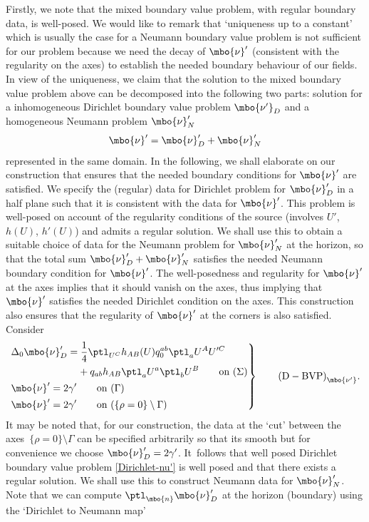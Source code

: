 Firstly, we note that the mixed boundary value problem, with regular boundary data, is well-posed. We would like to remark that `uniqueness up to a constant' which is usually the case for a Neumann boundary value problem is not sufficient for our problem because we need the decay of $\mbo{\nu}'$ (consistent with the regularity on the axes) to establish the needed boundary behaviour of our fields.
In view of the uniqueness, we claim that the solution to the mixed boundary value problem above can be decomposed into the following two parts: solution for a inhomogeneous Dirichlet boundary value problem $\mbo{\nu'}_D$ and a homogeneous Neumann problem $\mbo{\nu}'_N$
\begin{align*}
\mbo{\nu}' = \mbo{\nu}'_D + \mbo{\nu}'_N
\end{align*}
represented in the same domain. In the following, we shall elaborate on our construction that ensures that the needed boundary conditions for $\mbo{\nu}'$ are satisfied. We specify the (regular) data for Dirichlet problem for $\mbo{\nu}'_D$ in a half plane such that it is consistent with the data for $\mbo{\nu}'$. This problem is well-posed on account of the regularity conditions of the source (involves $U'$, $h(U)$, $h'(U)$) and admits a regular solution. We shall use this to obtain a suitable choice of data for the Neumann problem for $\mbo{\nu}'_N$ at the horizon, so that the total sum $\mbo{\nu}'_D + \mbo{\nu}'_N$ satisfies the needed Neumann boundary condition for $\mbo{\nu}'$. The well-posedness and regularity for $\mbo{\nu}'$ at the axes implies that it should vanish on the axes, thus implying that $\mbo{\nu}'$ satisfies the needed Dirichlet condition on the axes. This construction also ensures that the regularity of $\mbo{\nu}'$ at the corners is also satisfied. Consider
\begin{equation} \label{Dirichlet-nu'}
\left.\begin{aligned}
&\Delta_0 \mbo{\nu}_D'=\frac{1}{4} \ptl_{U^C} h_{AB}(U) q^{ab}_{0} \ptl_a U^A U'^C\\
& \hphantom{\Delta_0 \mbo{\nu}_D'=}{} + q_{ab} h_{AB} \ptl_a U^a \ptl_b U^B \qquad \text{on}\ (\Sigma)\\
&\mbo{\nu}'=2 \gamma' \qquad \text{on} \ (\Gamma) \\
&\mbo{\nu}'=2 \gamma' \qquad \text{on} \ (\{ \rho=0\} \setminus \Gamma)
\end{aligned}
 \right\}
\qquad {\rm (D-BVP)}_{\mbo{\nu'}}.
\end{equation}
It may be noted that, for our construction, the data at the `cut' between the axes~${\{ \rho =0\} \setminus \Gamma}$ can be specified arbitrarily so that its smooth but for convenience we choose $ \mbo{\nu}'_D = 2 \gamma'$. It~follows that well posed Dirichlet boundary value problem \eqref{Dirichlet-nu'} is well posed and that there exists a regular solution. We shall use this to construct Neumann data for $\mbo{\nu}'_N$. Note that we can compute $\ptl_{\mbo{n}} \mbo{\nu}'_D$ at the horizon (boundary) using the `Dirichlet to Neumann map'
